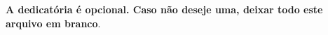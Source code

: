 \begin{dedicatoria}
   \vspace*{\fill}
   \centering
   \noindent
	\textbf{A dedicatória é opcional. Caso não deseje uma, deixar todo este
	arquivo em branco}.  \vspace*{\fill}
\end{dedicatoria}
